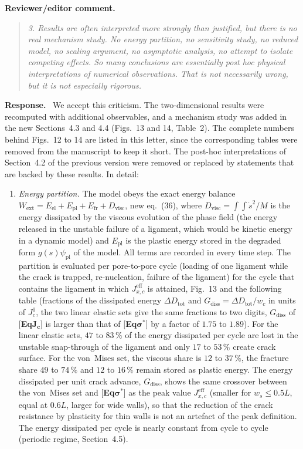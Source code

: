 \documentclass[pdflatex,sn-mathphys-num]{sn-jnl}
\newcommand{\EqJcLabel}{[\textbf{Eq$\boldsymbol{J_c}$}]\xspace}
\newcommand{\EqSigmaStarLabel}{[\textbf{Eq$\boldsymbol{\sigma^*}$}]\xspace}
\newenvironment{reviewercomment}
  {\par\noindent\textbf{Reviewer/editor comment.}\begin{quote}\itshape}
  {\end{quote}}
\newenvironment{response}
  {\par\noindent\textbf{Response.}\ }
  {\par}
\begin{document}
\begin{reviewercomment}
3. Results are often interpreted more strongly than justified, but there is no real mechanism study. No energy
partition, no sensitivity study, no reduced model, no scaling argument, no asymptotic analysis, no attempt to isolate
competing effects. So many conclusions are essentially post hoc physical interpretations of numerical observations.
That is not necessarily wrong, but it is not especially rigorous.
\end{reviewercomment}

\begin{response}
We accept this criticism. The two-dimensional results were recomputed with additional observables, and a mechanism study was added in the new Sections~4.3 and 4.4 (Figs.~13 and 14, Table~2). The complete numbers behind Figs.~12 to 14 are listed in this letter, since the corresponding tables were removed from the manuscript to keep it short. The post-hoc interpretations of Section~4.2 of the previous version were removed or replaced by statements that are backed by these results. In detail:
\begin{enumerate}
\item \emph{Energy partition.} The model obeys the exact energy balance $W_{\text{ext}} = E_{\text{el}} + E_{\text{pl}} + E_{\text{fr}} + D_{\text{visc}}$, new eq.~(36), where $D_{\text{visc}} = \int\!\!\int \dot{s}^2/M$ is the energy dissipated by the viscous evolution of the phase field (the energy released in the unstable failure of a ligament, which would be kinetic energy in a dynamic model) and $E_{\text{pl}}$ is the plastic energy stored in the degraded form $g(s)\psi_{\text{pl}}$ of the model. All terms are recorded in every time step. The partition is evaluated per pore-to-pore cycle (loading of one ligament while the crack is trapped, re-nucleation, failure of the ligament) for the cycle that contains the ligament in which $J_{x,c}^{\text{eff}}$ is attained, Fig.~13 and the following table (fractions of the dissipated energy $\Delta D_{\text{tot}}$ and $G_{\text{diss}} = \Delta D_{\text{tot}}/w_c$ in units of $J_c^0$, the two linear elastic sets give the same fractions to two digits, $G_{\text{diss}}$ of \EqJcLabel is larger than that of \EqSigmaStarLabel by a factor of $1.75$ to $1.89$). For the linear elastic sets, $47$ to $83\,\%$ of the energy dissipated per cycle are lost in the unstable snap-through of the ligament and only $17$ to $53\,\%$ create crack surface. For the von~Mises set, the viscous share is $12$ to $37\,\%$, the fracture share $49$ to $74\,\%$ and $12$ to $16\,\%$ remain stored as plastic energy. The energy dissipated per unit crack advance, $G_{\text{diss}}$, shows the same crossover between the von~Mises set and \EqSigmaStarLabel as the peak value $J_{x,c}^{\text{eff}}$ (smaller for $w_s \le 0.5L$, equal at $0.6L$, larger for wide walls), so that the reduction of the crack resistance by plasticity for thin walls is not an artefact of the peak definition. The energy dissipated per cycle is nearly constant from cycle to cycle (periodic regime, Section~4.5).

\end{enumerate}
\end{response}
\end{document}
